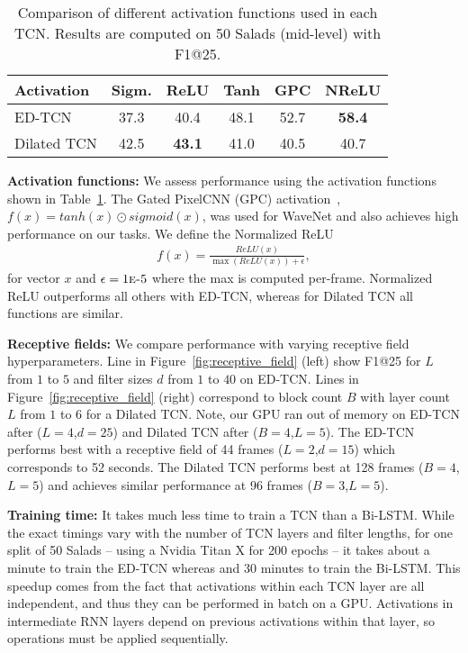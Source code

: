 \documentclass[10pt,twocolumn,letterpaper]{article}
\newcommand{\fakesubsection}[1]{\smallskip\noindent\textbf{#1:}}
\begin{document}
\begin{table}
	\centering
	\begin{tabular}{|l|c|c|c|c|c|}
		\hline
		Activation  & Sigm. &  ReLU & Tanh   & GPC & NReLU  \\
		\hline
		ED-TCN  &  37.3 & 40.4 & 48.1 &   52.7 & \textbf{58.4} \\
		Dilated TCN & 42.5 &\textbf{43.1} &41.0  & 40.5 & 40.7 \\
		\hline
	\end{tabular}
	\label{tab:activations}	
	\caption{Comparison of different activation functions used in each TCN. Results are computed on 50 Salads (mid-level) with F1@25.}
\end{table}


\fakesubsection{Activation functions}
We assess performance using the activation functions shown in Table~\ref{tab:activations}.
The Gated PixelCNN (GPC) activation~\cite{GatedPixelCNN}, $f(x)=tanh(x) \odot sigmoid(x)$, was used for WaveNet and also achieves high performance on our tasks. 
We define the Normalized ReLU 
\begin{align}
f(x) = \frac{ReLU(x)}{\max(ReLU(x))+\epsilon},
\end{align}
for vector $x$ and $\epsilon=1\text{\sc{e}-}5$ where the max is computed per-frame.
Normalized ReLU outperforms all others with ED-TCN, whereas for Dilated TCN all functions are similar. 






\fakesubsection{Receptive fields}
We compare performance with varying receptive field hyperparameters. 
Line in Figure~\ref{fig:receptive_field} (left) show F1@25 for $L$ from $1$ to $5$ and filter sizes $d$ from $1$ to $40$ on ED-TCN. 
Lines in Figure~\ref{fig:receptive_field} (right) correspond to block count $B$ with layer count $L$ from $1$ to $6$ for a Dilated TCN. Note, our GPU ran out of memory on ED-TCN after ($L=4$,$d=25$) and Dilated TCN after ($B=4$,$L=5$).
The ED-TCN performs best with a receptive field of 44 frames ($L=2$,$d=15$) which corresponds to 52 seconds. The Dilated TCN performs best at 128 frames ($B=4$,$L=5$) and achieves similar performance at 96 frames ($B=3$,$L=5$). 







\fakesubsection{Training time}
It takes much less time to train a TCN than a Bi-LSTM. 
While the exact timings vary with the number of TCN layers and filter lengths, for one split of 50 Salads -- using a Nvidia Titan X for 200 epochs -- it takes about a minute to train the ED-TCN whereas and 30 minutes to train the Bi-LSTM. This speedup comes from the fact that activations within each TCN layer are all independent, and thus they can be performed in batch on a GPU. Activations in intermediate RNN layers depend on previous activations within that layer, so operations must be applied sequentially. 
\end{document}
